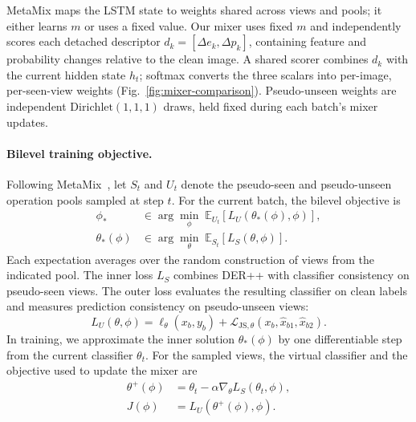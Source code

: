 \documentclass[10pt,twocolumn,letterpaper]{article}
\begin{document}
MetaMix maps the LSTM state to weights shared across views and pools; it either learns $m$ or uses a fixed value. Our mixer uses fixed $m$ and independently scores each detached descriptor $d_k=[\Delta e_k,\Delta p_k]$, containing feature and probability changes relative to the clean image. A shared scorer combines $d_k$ with the current hidden state $h_t$; softmax converts the three scalars into per-image, per-seen-view weights (Fig.~\ref{fig:mixer-comparison}). Pseudo-unseen weights are independent $\mathrm{Dirichlet}(1,1,1)$ draws, held fixed during each batch's mixer updates.

\paragraph{Bilevel training objective.}
Following MetaMix~\cite{wang2023metamix}, let $S_t$ and $U_t$ denote the pseudo-seen and pseudo-unseen operation pools sampled at step $t$. For the current batch, the bilevel objective is
\begin{align}
  \phi_* &\in \arg\min_{\phi}\;
    \mathbb{E}_{U_t}\!\left[L_U(\theta_*(\phi),\phi)\right], \label{eq:outer}\\
  \theta_*(\phi) &\in \arg\min_{\theta}\;
    \mathbb{E}_{S_t}\!\left[L_S(\theta,\phi)\right].
\end{align}
Each expectation averages over the random construction of views from the indicated pool. The inner loss $L_S$ combines DER++ with classifier consistency on pseudo-seen views. The outer loss evaluates the resulting classifier on clean labels and measures prediction consistency on pseudo-unseen views:
\begin{equation}
  L_U(\theta,\phi)=\ell_\theta(x_b,y_b)
    +\mathcal{L}_{\mathrm{JS},\theta}(x_b,\hat x_{b1},\hat x_{b2}).
\end{equation}
In training, we approximate the inner solution $\theta_*(\phi)$ by one differentiable step from the current classifier $\theta_t$. For the sampled views, the virtual classifier and the objective used to update the mixer are
\begin{align}
  \theta^+(\phi)&=\theta_t-\alpha\nabla_\theta L_S(\theta_t,\phi), \label{eq:virtual-step}\\
  J(\phi)&=L_U(\theta^+(\phi),\phi).
\end{align}
\end{document}
